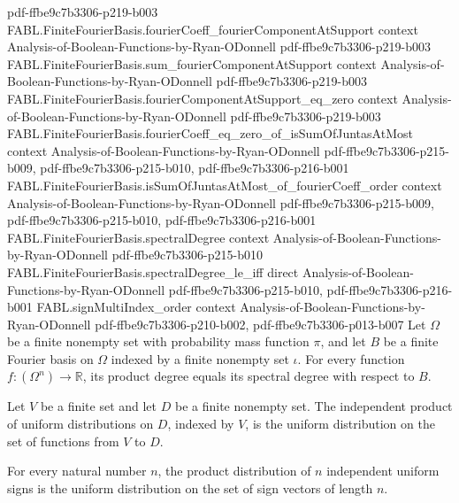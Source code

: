 \begin{theorem}
{    pdf-ffbe9c7b3306-p219-b003}
\proofstep
  {FABL.FiniteFourierBasis.fourierCoeff_fourierComponentAtSupport}
  {context}
  {Analysis-of-Boolean-Functions-by-Ryan-ODonnell}
  {pdf-ffbe9c7b3306-p219-b003}
\proofstep
  {FABL.FiniteFourierBasis.sum_fourierComponentAtSupport}
  {context}
  {Analysis-of-Boolean-Functions-by-Ryan-ODonnell}
  {pdf-ffbe9c7b3306-p219-b003}
\proofstep
  {FABL.FiniteFourierBasis.fourierComponentAtSupport_eq_zero}
  {context}
  {Analysis-of-Boolean-Functions-by-Ryan-ODonnell}
  {pdf-ffbe9c7b3306-p219-b003}
\proofstep
  {FABL.FiniteFourierBasis.fourierCoeff_eq_zero_of_isSumOfJuntasAtMost}
  {context}
  {Analysis-of-Boolean-Functions-by-Ryan-ODonnell}
  {pdf-ffbe9c7b3306-p215-b009,
    pdf-ffbe9c7b3306-p215-b010,
    pdf-ffbe9c7b3306-p216-b001}
\proofstep
  {FABL.FiniteFourierBasis.isSumOfJuntasAtMost_of_fourierCoeff_order}
  {context}
  {Analysis-of-Boolean-Functions-by-Ryan-ODonnell}
  {pdf-ffbe9c7b3306-p215-b009,
    pdf-ffbe9c7b3306-p215-b010,
    pdf-ffbe9c7b3306-p216-b001}
\proofstep
  {FABL.FiniteFourierBasis.spectralDegree}
  {context}
  {Analysis-of-Boolean-Functions-by-Ryan-ODonnell}
  {pdf-ffbe9c7b3306-p215-b010}
\proofstep
  {FABL.FiniteFourierBasis.spectralDegree_le_iff}
  {direct}
  {Analysis-of-Boolean-Functions-by-Ryan-ODonnell}
  {pdf-ffbe9c7b3306-p215-b010,
    pdf-ffbe9c7b3306-p216-b001}
\proofstep
  {FABL.signMultiIndex_order}
  {context}
  {Analysis-of-Boolean-Functions-by-Ryan-ODonnell}
  {pdf-ffbe9c7b3306-p210-b002,
    pdf-ffbe9c7b3306-p013-b007}
Let $\Omega$ be a finite nonempty set with probability mass function $\pi$, and let $B$
be a finite Fourier basis on $\Omega$ indexed by a finite nonempty set $\iota$. For
every function $f:(\Omega^n)\to\mathbb R$, its product degree equals its spectral degree
with respect to $B$.
\end{theorem}

\begin{theorem}
\label{FABL.productProbabilityPMF_uniform}
\leanok
{}
Let $V$ be a finite set and let $D$ be a finite nonempty set. The independent product of
uniform distributions on $D$, indexed by $V$, is the uniform distribution on the set of
functions from $V$ to $D$.
\end{theorem}

\begin{theorem}
\label{FABL.productProbabilityPMF_uniformSign}
\leanok
{}
For every natural number $n$, the product distribution of $n$ independent uniform signs
is the uniform distribution on the set of sign vectors of length $n$.
\end{theorem}

